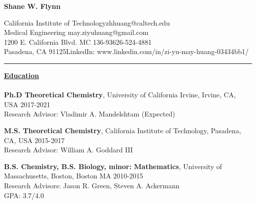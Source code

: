\documentclass[letterpaper]{article}
\def\name{Shane W. Flynn}
\begin{document}
\centerline{\huge \textbf{\name}}

\vspace{0.1in}

California Institute of Technology\hfill zhhuang@caltech.edu\\
Medical Engineering \hfill may.ziyuhuang@gmail.com \\
1200 E. California Blvd. MC 136-93\hfill 626-524-4881\\
Pasadena, CA 91125\hfill LinkedIn: www.linkedin.com/in/zi-yu-may-huang-03434bb1/\\
\hrule


\vspace{0.1in}
{\large \textbf{\underline{Education}}}\\
\vspace{-0.1in}\\
\textbf{Ph.D  Theoretical Chemistry}, University of California Irvine, Irvine,
CA, USA  \hfill 2017-2021\\
Research Advisor: Vladimir A. Mandelshtam \null \hfill (Expected)
\vspace{0.08in}

\textbf{M.S. Theoretical Chemistry}, California Institute of Technology, Pasadena, CA, USA  \hfill 2015-2017 \\
Research Advisor: William A. Goddard III\\
\vspace{0.08in}

\textbf{B.S. Chemistry, B.S. Biology, minor: Mathematics}, University of
Massachusetts, Boston, Boston MA \hfill 2010-2015\\
Research Advisors: Jason R. Green, Steven A. Ackermann\\
GPA: 3.7/4.0
\vspace{0.1in}
\end{document}
